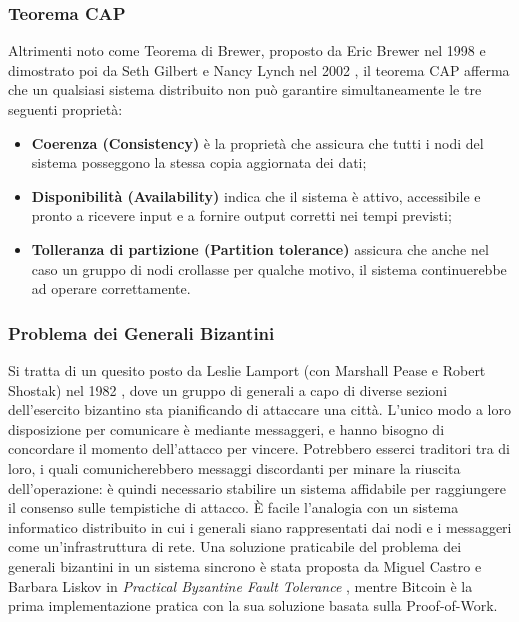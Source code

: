 		\subsubsection{Teorema CAP}\label{sec:teorema_CAP}
			Altrimenti noto come Teorema di Brewer, proposto da Eric Brewer nel 1998 e dimostrato poi da Seth Gilbert e Nancy Lynch nel 2002 \cite{CAP}, il teorema CAP afferma che un qualsiasi sistema distribuito non può garantire simultaneamente le tre seguenti proprietà:
			\begin{itemize}
				\item \textbf{Coerenza (Consistency)} è la proprietà che assicura che tutti i nodi del sistema posseggono la stessa copia aggiornata dei dati;
				\item \textbf{Disponibilità (Availability)} indica che il sistema è attivo, accessibile e pronto a ricevere input e a fornire output corretti nei tempi previsti;
				\item \textbf{Tolleranza di partizione (Partition tolerance)} assicura che anche nel caso un gruppo di nodi crollasse per qualche motivo, il sistema continuerebbe ad operare correttamente.
			\end{itemize}

		\subsubsection{Problema dei Generali Bizantini}
			Si tratta di un quesito posto da Leslie Lamport (con Marshall Pease e Robert Shostak) nel 1982 \cite{BGP}, dove un gruppo di generali a capo di diverse sezioni dell'esercito bizantino sta pianificando di attaccare una città. L'unico modo a loro disposizione per comunicare è mediante messaggeri, e hanno bisogno di concordare il momento dell'attacco per vincere. Potrebbero esserci traditori tra di loro, i quali comunicherebbero messaggi discordanti per minare la riuscita dell'operazione: è quindi necessario stabilire un sistema affidabile per raggiungere il consenso sulle tempistiche di attacco. È facile l'analogia con un sistema informatico distribuito in cui i generali siano rappresentati dai nodi e i messaggeri come un'infrastruttura di rete. Una soluzione praticabile del problema dei generali bizantini in un sistema sincrono è stata proposta da Miguel Castro e Barbara Liskov in \emph{Practical Byzantine Fault Tolerance} \cite{PBFT}, mentre Bitcoin è la prima implementazione pratica con la sua soluzione basata sulla Proof-of-Work.

